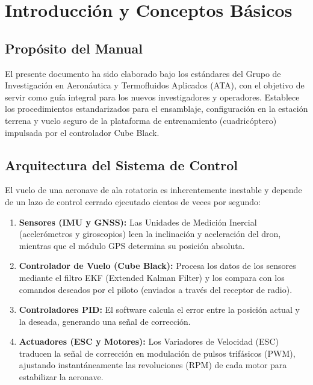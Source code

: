 \documentclass[12pt,a4paper]{article}
\begin{document}
\newpage

\section{Introducción y Conceptos Básicos}

\subsection{Propósito del Manual}
El presente documento ha sido elaborado bajo los estándares del Grupo de Investigación en Aeronáutica y Termofluidos Aplicados (ATA), con el objetivo de servir como guía integral para los nuevos investigadores y operadores. Establece los procedimientos estandarizados para el ensamblaje, configuración en la estación terrena y vuelo seguro de la plataforma de entrenamiento (cuadricóptero) impulsada por el controlador Cube Black.

\subsection{Arquitectura del Sistema de Control}
El vuelo de una aeronave de ala rotatoria es inherentemente inestable y depende de un lazo de control cerrado ejecutado cientos de veces por segundo:
\begin{enumerate}[leftmargin=*]
    \item \textbf{Sensores (IMU y GNSS):} Las Unidades de Medición Inercial (acelerómetros y giroscopios) leen la inclinación y aceleración del dron, mientras que el módulo GPS determina su posición absoluta.
    \item \textbf{Controlador de Vuelo (Cube Black):} Procesa los datos de los sensores mediante el filtro EKF (Extended Kalman Filter) y los compara con los comandos deseados por el piloto (enviados a través del receptor de radio).
    \item \textbf{Controladores PID:} El software calcula el error entre la posición actual y la deseada, generando una señal de corrección.
    \item \textbf{Actuadores (ESC y Motores):} Los Variadores de Velocidad (ESC) traducen la señal de corrección en modulación de pulsos trifásicos (PWM), ajustando instantáneamente las revoluciones (RPM) de cada motor para estabilizar la aeronave.
\end{enumerate}
\end{document}
